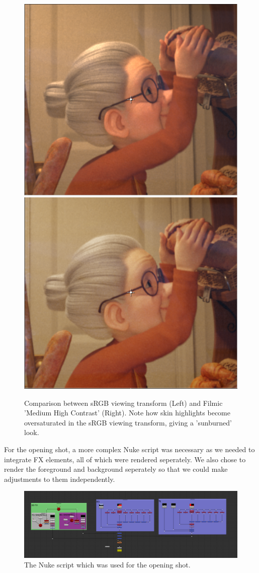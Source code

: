 \documentclass[11pt]{article}
\begin{document}
\begin{figure}[htbp]
\centering
\includegraphics[width=0.45\linewidth]{images/srgb_nellie.png}
\hfill
\includegraphics[width=0.45\linewidth]{images/filmic_nellie.png}
\caption{\label{figure:filmic} Comparison between sRGB viewing transform (Left) and Filmic 'Medium High Contrast' (Right). Note how skin highlights become oversaturated in the sRGB viewing transform, giving a 'sunburned' look.}
\end{figure}

For the opening shot, a more complex Nuke script was necessary as we needed to integrate FX elements, all of which were rendered seperately. We also chose to render the foreground and background seperately so that we could make adjustments to them independently.
\begin{figure}[htbp]\centering
	\includegraphics[width=1.0\linewidth]{images/shot010comp.png}
	\caption{\label{figure:shot010comp} The Nuke script which was used for the opening shot.}
\end{figure}



\end{document}
